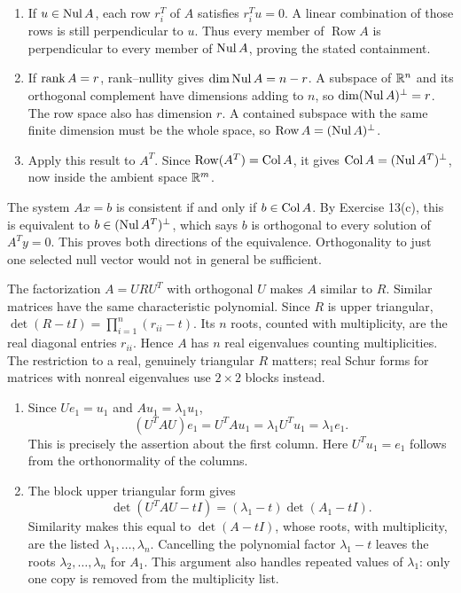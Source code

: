 \begin{enumerate}[label=(\alph*)]
\item If $u\in\operatorname{Nul} A$, each row $r_i^T$ of $A$ satisfies
$r_i^Tu=0$. A linear combination of those rows is still perpendicular
to $u$. Thus every member of $\operatorname{Row}A$ is perpendicular
to every member of $\operatorname{Nul} A$, proving the stated containment.
\item If $\operatorname{rank} A=r$, rank--nullity gives $\dim\operatorname{Nul} A=n-r$.
A subspace of $\mathbb{R}^n$ and its orthogonal complement have dimensions
adding to $n$, so $\dim(\operatorname{Nul} A)^\perp=r$.
The row space also has dimension $r$. A contained subspace with the same
finite dimension must be the whole space, so
$\operatorname{Row}A=(\operatorname{Nul} A)^\perp$.
\item Apply this result to $A^T$. Since
$\operatorname{Row}(A^T)=\operatorname{Col} A$, it gives
$\operatorname{Col} A=(\operatorname{Nul} A^T)^\perp$, now inside the ambient space $\mathbb{R}^m$.
\end{enumerate}

The system $Ax=b$ is consistent if and only if $b\in\operatorname{Col} A$.
By Exercise 13(c), this is equivalent to $b\in(\operatorname{Nul} A^T)^\perp$,
which says $b$ is orthogonal to every solution of $A^Ty=0$.
This proves both directions of the equivalence. Orthogonality to just
one selected null vector would not in general be sufficient.

The factorization $A=URU^T$ with orthogonal $U$ makes $A$ similar to $R$.
Similar matrices have the same characteristic polynomial. Since $R$ is
upper triangular,
$\det(R-tI)=\prod_{i=1}^n(r_{ii}-t)$.
Its $n$ roots, counted with multiplicity, are the real diagonal entries
$r_{ii}$. Hence $A$ has $n$ real eigenvalues counting multiplicities.
The restriction to a real, genuinely triangular $R$ matters; real Schur
forms for matrices with nonreal eigenvalues use $2\times2$ blocks instead.

\begin{enumerate}[label=(\alph*)]
\item Since $Ue_1=u_1$ and $Au_1=\lambda_1u_1$,
\[
 (U^TAU)e_1=U^TAu_1=\lambda_1U^Tu_1=\lambda_1e_1.
\]
This is precisely the assertion about the first column. Here
$U^Tu_1=e_1$ follows from the orthonormality of the columns.
\item The block upper triangular form gives
\[
 \det(U^TAU-tI)=(\lambda_1-t)\det(A_1-tI).
\]
Similarity makes this equal to $\det(A-tI)$, whose roots, with
multiplicity, are the listed $\lambda_1,\ldots,\lambda_n$.
Cancelling the polynomial factor $\lambda_1-t$ leaves the roots
$\lambda_2,\ldots,\lambda_n$ for $A_1$.
This argument also handles repeated values of $\lambda_1$: only one copy
is removed from the multiplicity list.
\end{enumerate}

